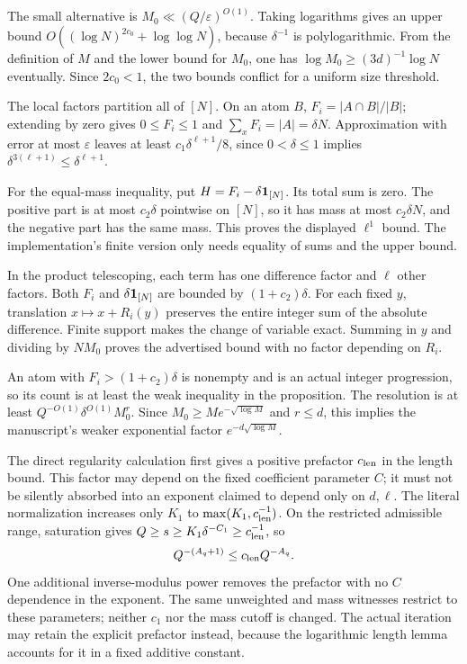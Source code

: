 The small alternative is $M_0\ll(Q/\varepsilon)^{O(1)}$. Taking logarithms gives an upper bound $O((\log N)^{2c_0}+\log\log N)$, because $\delta^{-1}$ is polylogarithmic. From the definition of $M$ and the lower bound for $M_0$, one has $\log M_0\geq(3d)^{-1}\log N$ eventually. Since $2c_0<1$, the two bounds conflict for a uniform size threshold.

The local factors partition all of $[N]$. On an atom $B$, $F_i=|A\cap B|/|B|$; extending by zero gives $0\leq F_i\leq1$ and $\sum_xF_i=|A|=\delta N$. Approximation with error at most $\varepsilon$ leaves at least $c_1\delta^{\ell+1}/8$, since $0<\delta\leq1$ implies $\delta^{3(\ell+1)}\leq\delta^{\ell+1}$.

For the equal-mass inequality, put $H=F_i-\delta\mathbf 1_{[N]}$. Its total sum is zero. The positive part is at most $c_2\delta$ pointwise on $[N]$, so it has mass at most $c_2\delta N$, and the negative part has the same mass. This proves the displayed $\ell^1$ bound. The implementation's finite version only needs equality of sums and the upper bound.

In the product telescoping, each term has one difference factor and $\ell$ other factors. Both $F_i$ and $\delta\mathbf 1_{[N]}$ are bounded by $(1+c_2)\delta$. For each fixed $y$, translation $x\mapsto x+R_i(y)$ preserves the entire integer sum of the absolute difference. Finite support makes the change of variable exact. Summing in $y$ and dividing by $NM_0$ proves the advertised bound with no factor depending on $R_i$.

An atom with $F_i>(1+c_2)\delta$ is nonempty and is an actual integer progression, so its count is at least the weak inequality in the proposition. The resolution is at least $Q^{-O(1)}\delta^{O(1)}M_0^r$. Since $M_0\geq M e^{-\sqrt{\log M}}$ and $r\leq d$, this implies the manuscript's weaker exponential factor $e^{-d\sqrt{\log M}}$.

The direct regularity calculation first gives a positive prefactor $c_{\rm len}$ in the length bound. This factor may depend on the fixed coefficient parameter $C$; it must not be silently absorbed into an exponent claimed to depend only on $d,\ell$. The literal normalization increases only $K_1$ to $\max(K_1,c_{\rm len}^{-1})$. On the restricted admissible range, saturation gives $Q\geq s\geq K_1\delta^{-C_1}\geq c_{\rm len}^{-1}$, so
\[
 Q^{-(A_q+1)}\leq c_{\rm len}Q^{-A_q}.
\]
One additional inverse-modulus power removes the prefactor with no $C$ dependence in the exponent. The same unweighted and mass witnesses restrict to these parameters; neither $c_1$ nor the mass cutoff is changed. The actual iteration may retain the explicit prefactor instead, because the logarithmic length lemma accounts for it in a fixed additive constant.

